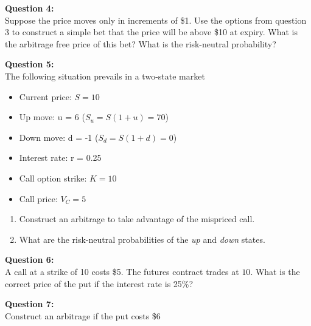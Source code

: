 \textbf{Question 4:}\\Suppose the price moves only in increments of \$1. Use the options from question 3 to construct a simple bet that the price will be above \$10 at expiry. What is the arbitrage free price of this bet? What is the risk-neutral probability?


\textbf{Question 5:}\\The following situation prevails in a two-state market
\begin{itemize}
\item Current price:  $S = 10$
\item Up move: u = 6 ($S_u =  S(1+u) = 70$)
\item Down move: d = -1 ($S_d = S(1+d) = 0$)
\item Interest rate: r = 0.25
\item Call option strike: $K =10$ 
\item Call price: $V_C = 5$
\end{itemize}

 \begin{enumerate}
 \item Construct an arbitrage to take advantage of the mispriced call.\\
\item What are the risk-neutral probabilities of the \textit{up} and \textit{down} states.
\end{enumerate}

\textbf{Question 6:}\\A call at a strike of 10 costs \$5. The futures contract trades at $10$. What is the correct price of the put if the interest rate is 25\%?

\textbf{Question 7:}\\
Construct an arbitrage if the put costs \$6









